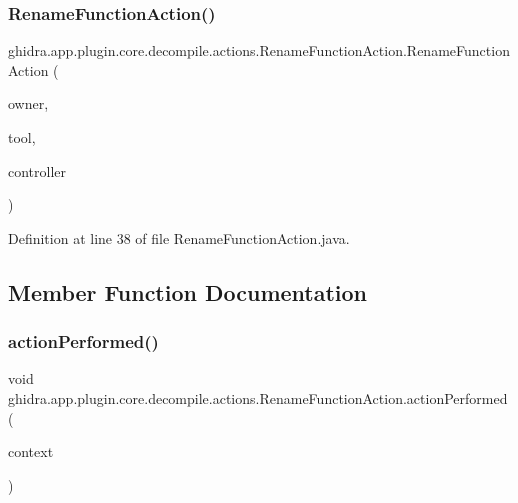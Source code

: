 \subsubsection{\texorpdfstring{RenameFunctionAction()}{RenameFunctionAction()}}
{\footnotesize\ttfamily ghidra.\+app.\+plugin.\+core.\+decompile.\+actions.\+Rename\+Function\+Action.\+Rename\+Function\+Action (\begin{DoxyParamCaption}\item[{String}]{owner,  }\item[{Plugin\+Tool}]{tool,  }\item[{\mbox{\hyperlink{classghidra_1_1app_1_1decompiler_1_1component_1_1_decompiler_controller}{Decompiler\+Controller}}}]{controller }\end{DoxyParamCaption})\hspace{0.3cm}{\ttfamily [inline]}}



Definition at line 38 of file Rename\+Function\+Action.\+java.



\subsection{Member Function Documentation}
\mbox{\label{classghidra_1_1app_1_1plugin_1_1core_1_1decompile_1_1actions_1_1_rename_function_action_a67fbf7fa2650bcc9761f5f92f2d4a741}} 
\subsubsection{\texorpdfstring{actionPerformed()}{actionPerformed()}}
{\footnotesize\ttfamily void ghidra.\+app.\+plugin.\+core.\+decompile.\+actions.\+Rename\+Function\+Action.\+action\+Performed (\begin{DoxyParamCaption}\item[{Action\+Context}]{context }\end{DoxyParamCaption})\hspace{0.3cm}{\ttfamily [inline]}}



